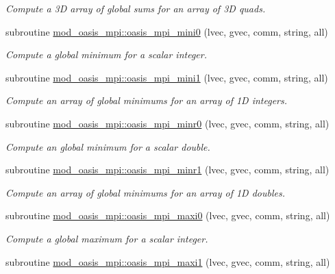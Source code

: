 \begin{DoxyCompactItemize}
\begin{DoxyCompactList}\small\item\em Compute a 3D array of global sums for an array of 3D quads. \end{DoxyCompactList}\item 
subroutine \hyperlink{namespacemod__oasis__mpi_a2832568cd4d34db40cdcc39ffa876474}{mod\+\_\+oasis\+\_\+mpi\+::oasis\+\_\+mpi\+\_\+mini0} (lvec, gvec, comm, string, all)
\begin{DoxyCompactList}\small\item\em Compute a global minimum for a scalar integer. \end{DoxyCompactList}\item 
subroutine \hyperlink{namespacemod__oasis__mpi_aed0c20d56fdab764f0ad8e48e3a7209f}{mod\+\_\+oasis\+\_\+mpi\+::oasis\+\_\+mpi\+\_\+mini1} (lvec, gvec, comm, string, all)
\begin{DoxyCompactList}\small\item\em Compute an array of global minimums for an array of 1D integers. \end{DoxyCompactList}\item 
subroutine \hyperlink{namespacemod__oasis__mpi_af3628ad005b1a21e8f33e3dc2be38635}{mod\+\_\+oasis\+\_\+mpi\+::oasis\+\_\+mpi\+\_\+minr0} (lvec, gvec, comm, string, all)
\begin{DoxyCompactList}\small\item\em Compute an global minimum for a scalar double. \end{DoxyCompactList}\item 
subroutine \hyperlink{namespacemod__oasis__mpi_a29c460b836ae9ad77ee1ac21f684d188}{mod\+\_\+oasis\+\_\+mpi\+::oasis\+\_\+mpi\+\_\+minr1} (lvec, gvec, comm, string, all)
\begin{DoxyCompactList}\small\item\em Compute an array of global minimums for an array of 1D doubles. \end{DoxyCompactList}\item 
subroutine \hyperlink{namespacemod__oasis__mpi_a0b469347d40c78c317042fa069d9baa5}{mod\+\_\+oasis\+\_\+mpi\+::oasis\+\_\+mpi\+\_\+maxi0} (lvec, gvec, comm, string, all)
\begin{DoxyCompactList}\small\item\em Compute a global maximum for a scalar integer. \end{DoxyCompactList}\item 
subroutine \hyperlink{namespacemod__oasis__mpi_a2ba8d76b016ddde4013aecc2ca0b1d9f}{mod\+\_\+oasis\+\_\+mpi\+::oasis\+\_\+mpi\+\_\+maxi1} (lvec, gvec, comm, string, all)

\end{DoxyCompactItemize}
